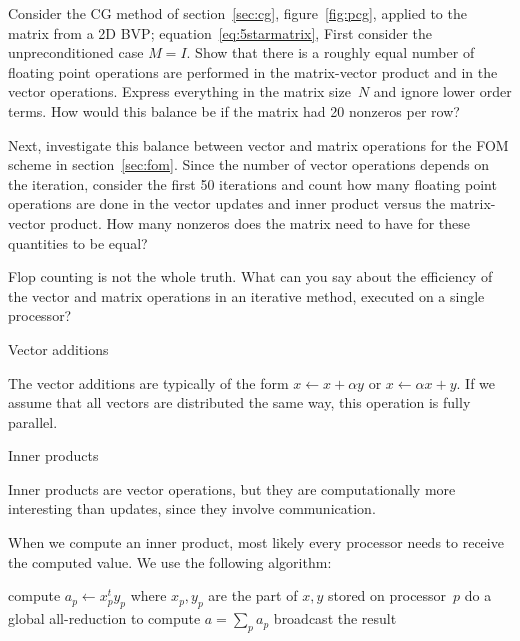 \begin{exercise}
  Consider the \ac{CG} method of section~\ref{sec:cg},
  figure~\ref{fig:pcg}, applied to the
  matrix from a 2D \ac{BVP}; equation~\eqref{eq:5starmatrix}, First
  consider the unpreconditioned case $M=I$. Show that there is a
  roughly equal number of floating point
  operations are performed in the matrix-vector product and 
  in the vector operations. Express everything in the matrix size~$N$ and
  ignore lower order terms. How would this balance be if the matrix
  had 20 nonzeros per row?

  Next, investigate this balance between vector and matrix operations
  for the \ac{FOM} scheme in section~\ref{sec:fom}. Since the number
  of vector operations depends on the iteration, consider the first 50
  iterations and count how many floating point operations are done in
  the vector updates and inner product versus the matrix-vector
  product. How many nonzeros does the matrix need to have for these
  quantities to be equal?
\end{exercise}

\begin{exercise}
  Flop counting is not the whole truth. What can you say about the
  efficiency of the vector and matrix operations in an iterative
  method, executed on a single processor?
\end{exercise}

 {Vector additions}

The vector additions are
typically of the form $x\leftarrow x+\alpha y$ or $x\leftarrow \alpha x+y$.
If we assume that all vectors are distributed the same way, this
operation is fully parallel.

 {Inner products}
\label{sec:iter-inprod}

Inner products are vector operations, but they are computationally
more interesting than updates, since they involve communication. 

When we compute an inner product, most likely 
every processor needs to receive the computed value. We
use the following algorithm:

\begin{displayalgorithm}
   {
    compute $a_p\leftarrow x_p^ty_p$ where $x_p,y_p$ are the part of
    $x,y$ stored on processor~$p$ }
    do a global all-reduction to compute $a=\sum_p a_p$ \;
    broadcast the result
  \caption{Compute $a\leftarrow x^ty$ where $x,y$ are distributed vectors.}
\end{displayalgorithm}

